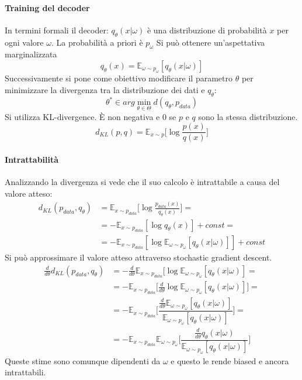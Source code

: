 		\paragraph{Training del decoder}
		In termini formali il decoder: $q_\theta(x|\omega)$ \`e una distribuzione di probabilit\`a $x$ per ogni valore $\omega$.
		La probabilit\`a a priori \`e $p_\omega$
		Si pu\`o ottenere un'aspettativa marginalizzata
		$$q_\theta(x) = \mathbb{E}_{\omega\sim p_\omega}[q_\theta(x|\omega)]$$
		Successivamente si pone come obiettivo modificare il parametro $\theta$ per minimizzare la divergenza tra la distribuzione dei dati e $q_\theta$:
		$$\theta^*\in arg\min\limits_{\theta\in\Theta}d(q_\theta,p_{data})$$
		Si utilizza KL-divergence.
		\`E non negativa e $0$ se $p$ e $q$ sono la stessa distribuzione.
		$$d_{KL}(p,q) = \mathbb{E}_{x\sim p}\bigl[\log\frac{p(x)}{q(x)}\bigr]$$
		
		\paragraph{Intrattabilit\`a}
		Analizzando la divergenza si vede che il suo calcolo \`e intrattabile a causa del valore atteso:
		\begin{align*}
			d_{KL}(p_{data}, q_\theta) &= \mathbb{E}_{x\sim p_{data}}\bigl[\log\frac{p_{data}(x)}{q_\theta(x)}\bigr]=\\
			& = -\mathbb{E}_{x\sim p_{data}}[\log q_\theta(x)] + const=\\
			&= -\mathbb{E}_{x\sim p_{data}}[\log\mathbb{E}_{\omega\sim p_\omega} [q_\theta(x|\omega)]]+const
		\end{align*}
		Si pu\`o approssimare il valore atteso attraverso stochastic gradient descent.
		\begin{align*}
			\frac{d}{d\theta}d_{KL}(p_{data},q_\theta) &= -\frac{d}{d\theta}\mathbb{E}_{x\sim p_{data}}[\log\mathbb{E}_{\omega\sim p_\omega}[q_\theta(x|\omega)]=\\
			& = -\mathbb{E}_{x\sim p_{data}}\bigl[\frac{d}{d\theta}\log\mathbb{E}_{\omega\sim p_\omega}[q_\theta(x|\omega)]\bigr]=\\
			& = - \mathbb{E}_{x\sim p_{data}}\biggl[\dfrac{\frac{d}{d\theta}\mathbb{E}_{\omega\sim p_\omega}[q_\theta(x|\omega)]}{\mathbb{E}_{\omega\sim p_\omega}[q_\theta(x|\omega)]}\biggr]=\\
			& = - \mathbb{E}_{x\sim p_{data}}\mathbb{E}_{\omega\sim p_\omega}\biggl[\dfrac{\frac{d}{d\theta}q_\theta(x|\omega)}{\mathbb{E}_{\omega\sim p_\omega}[q_\theta(x|\omega)]}\biggr]
		\end{align*}
		Queste stime sono comunque dipendenti da $\omega$ e questo le rende biased e ancora intrattabili.
		
